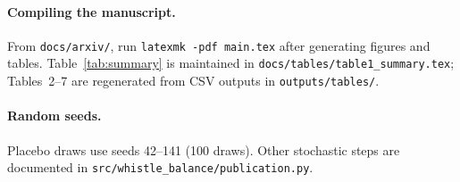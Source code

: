 \paragraph{Compiling the manuscript.}
From \texttt{docs/arxiv/}, run \texttt{latexmk -pdf main.tex} after generating figures and tables. Table~\ref{tab:summary} is maintained in \texttt{docs/tables/table1\_summary.tex}; Tables~2--7 are regenerated from CSV outputs in \texttt{outputs/tables/}.

\paragraph{Random seeds.}
Placebo draws use seeds 42--141 (100 draws). Other stochastic steps are documented in \texttt{src/whistle\_balance/publication.py}.
